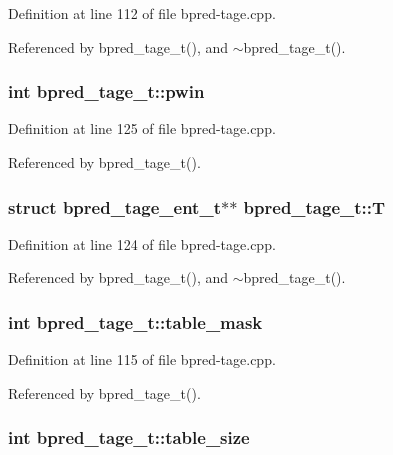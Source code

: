 Definition at line 112 of file bpred-tage.cpp.

Referenced by bpred\_\-tage\_\-t(), and $\sim$bpred\_\-tage\_\-t().
\subsubsection[{pwin}]{\setlength{\rightskip}{0pt plus 5cm}int {\bf bpred\_\-tage\_\-t::pwin}\hspace{0.3cm}{\tt  [protected]}}\label{classbpred__tage__t_9d0ddd369f7f3605b45a9473e99b773f}




Definition at line 125 of file bpred-tage.cpp.

Referenced by bpred\_\-tage\_\-t().
\subsubsection[{T}]{\setlength{\rightskip}{0pt plus 5cm}struct {\bf bpred\_\-tage\_\-ent\_\-t}$\ast$$\ast$ {\bf bpred\_\-tage\_\-t::T}\hspace{0.3cm}{\tt  [read, protected]}}\label{classbpred__tage__t_46473a31fdafdb4d5728d002778e7ca9}




Definition at line 124 of file bpred-tage.cpp.

Referenced by bpred\_\-tage\_\-t(), and $\sim$bpred\_\-tage\_\-t().
\subsubsection[{table\_\-mask}]{\setlength{\rightskip}{0pt plus 5cm}int {\bf bpred\_\-tage\_\-t::table\_\-mask}\hspace{0.3cm}{\tt  [protected]}}\label{classbpred__tage__t_8b82b8c4e3b9b157befcadab58bcb1f4}




Definition at line 115 of file bpred-tage.cpp.

Referenced by bpred\_\-tage\_\-t().
\subsubsection[{table\_\-size}]{\setlength{\rightskip}{0pt plus 5cm}int {\bf bpred\_\-tage\_\-t::table\_\-size}\hspace{0.3cm}{\tt  [protected]}}\label{classbpred__tage__t_587e7b4f3795c307e275b8a22561fe98}




